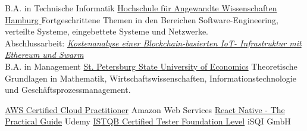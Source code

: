 \begin{minipage}[t]{0.5\textwidth}
\begin{entrylist}
   {B.A. in Technische Informatik} {\href{https://www.haw-hamburg.de/en/}{Hochschule für Angewandte Wissenschaften Hamburg }} {
    Fortgeschrittene Themen in den Bereichen Software-Engineering, verteilte Systeme, eingebettete Systeme und Netzwerke.\\
Abschlussarbeit: {\href{https://docplayer.org/204520791-Bachelorarbeit-artur-iablokov-kostenanalyse-einer-blockchain-basierten-iot-infrastruktur-mit-ethereum-und-swarm.html}{\emph{Kostenanalyse einer Blockchain-basierten IoT- Infrastruktur mit Ethereum und Swarm}}}
  }
  \\
   {B.A. in Management} {\href{https://en.unecon.ru/}{St. Petersburg State University of Economics}} {
    Theoretische Grundlagen in Mathematik, Wirtschaftswissenschaften, Informationstechnologie und Geschäftsprozessmanagement.
  }
\end{entrylist}
\end{minipage}
\hfill
\begin{minipage}[t]{0.45\textwidth}
  \begin{entrylist}
     {\href{https://www.credly.com/badges/40fba880-de13-489d-9936-c88cbd59e2d0/}{AWS Certified Cloud Practitioner}} {Amazon Web Services}
     {\href{https://www.udemy.com/certificate/UC-3d1f5088-e87b-4102-8e59-b39df95a5a84/}{React Native - The Practical Guide}} {Udemy}
     {\href{https://app.skillsclub.com/credential/26298-c17cec9e406f32f3ca718dc1ef4aae6d20339ce6fc4964f67f030a661d24137d?locale=de&badge=true}{ISTQB Certified Tester Foundation Level}} {iSQI GmbH}
  \end{entrylist}
\end{minipage}



